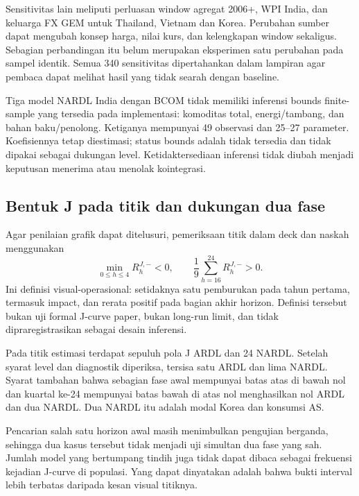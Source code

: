 Sensitivitas lain meliputi perluasan window agregat 2006+, WPI India, dan keluarga FX GEM untuk Thailand, Vietnam dan Korea. Perubahan sumber dapat mengubah konsep harga, nilai kurs, dan kelengkapan window sekaligus. Sebagian perbandingan itu belum merupakan eksperimen satu perubahan pada sampel identik. Semua 340 sensitivitas dipertahankan dalam lampiran agar pembaca dapat melihat hasil yang tidak searah dengan baseline.

Tiga model NARDL India dengan BCOM tidak memiliki inferensi bounds finite-sample yang tersedia pada implementasi: komoditas total, energi/tambang, dan bahan baku/penolong. Ketiganya mempunyai 49 observasi dan 25--27 parameter. Koefisiennya tetap diestimasi; status bounds adalah tidak tersedia dan tidak dipakai sebagai dukungan level. Ketidaktersediaan inferensi tidak diubah menjadi keputusan menerima atau menolak kointegrasi.

\subsection{Bentuk J pada titik dan dukungan dua fase}
Agar penilaian grafik dapat ditelusuri, pemeriksaan titik dalam deck dan naskah menggunakan
\begin{equation}
 \min_{0\le h\le4}R_h^{J,-}<0,\qquad
 \frac{1}{9}\sum_{h=16}^{24}R_h^{J,-}>0.
 \label{eq:jvisual}
\end{equation}
Ini definisi visual-operasional: setidaknya satu pemburukan pada tahun pertama, termasuk impact, dan rerata positif pada bagian akhir horizon. Definisi tersebut bukan uji formal J-curve paper, bukan long-run limit, dan tidak dipraregistrasikan sebagai desain inferensi.

\begin{table}[!htbp]\centering
\caption{Pola J pada seluruh model utama}
\label{tab:j}
\end{table}

Pada titik estimasi terdapat sepuluh pola J ARDL dan 24 NARDL. Setelah syarat level dan diagnostik diperiksa, tersisa satu ARDL dan lima NARDL. Syarat tambahan bahwa sebagian fase awal mempunyai batas atas di bawah nol dan kuartal ke-24 mempunyai batas bawah di atas nol menghasilkan nol ARDL dan dua NARDL. Dua NARDL itu adalah modal Korea dan konsumsi AS.

Pencarian salah satu horizon awal masih menimbulkan pengujian berganda, sehingga dua kasus tersebut tidak menjadi uji simultan dua fase yang sah. Jumlah model yang bertumpang tindih juga tidak dapat dibaca sebagai frekuensi kejadian J-curve di populasi. Yang dapat dinyatakan adalah bahwa bukti interval lebih terbatas daripada kesan visual titiknya.

